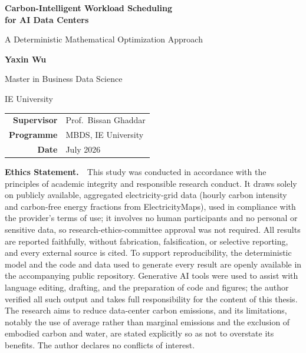 \documentclass[12pt,a4paper]{article}
\begin{document}
\pagestyle{plain}

\begin{titlepage}
\centering
\vspace*{2cm}
{\LARGE\bfseries\color{ieblue}
Carbon-Intelligent Workload Scheduling\\[6pt]
for AI Data Centers\par}
\vspace{12pt}
{\large A Deterministic Mathematical Optimization Approach\par}
\vspace{2cm}
{\large\bfseries Yaxin Wu\par}
\vspace{0.4cm}
{\normalsize Master in Business Data Science\par}
{\normalsize IE University\par}
\vspace{2cm}
\begin{tabular}{rl}
\textbf{Supervisor} & Prof.\ Bissan Ghaddar\\[4pt]
\textbf{Programme}  & MBDS, IE University\\[4pt]
\textbf{Date}       & July 2026\\
\end{tabular}
\vfill
\begin{minipage}{0.88\textwidth}
\footnotesize
\noindent\textbf{Ethics Statement.}\ \ This study was conducted in accordance with the principles of academic integrity and responsible research conduct. It draws solely on publicly available, aggregated electricity-grid data (hourly carbon intensity and carbon-free energy fractions from ElectricityMaps), used in compliance with the provider's terms of use; it involves no human participants and no personal or sensitive data, so research-ethics-committee approval was not required. All results are reported faithfully, without fabrication, falsification, or selective reporting, and every external source is cited. To support reproducibility, the deterministic model and the code and data used to generate every result are openly available in the accompanying public repository. Generative AI tools were used to assist with language editing, drafting, and the preparation of code and figures; the author verified all such output and takes full responsibility for the content of this thesis. The research aims to reduce data-center carbon emissions, and its limitations, notably the use of average rather than marginal emissions and the exclusion of embodied carbon and water, are stated explicitly so as not to overstate its benefits. The author declares no conflicts of interest.
\end{minipage}
\vspace{0.6cm}
\end{titlepage}
\end{document}
